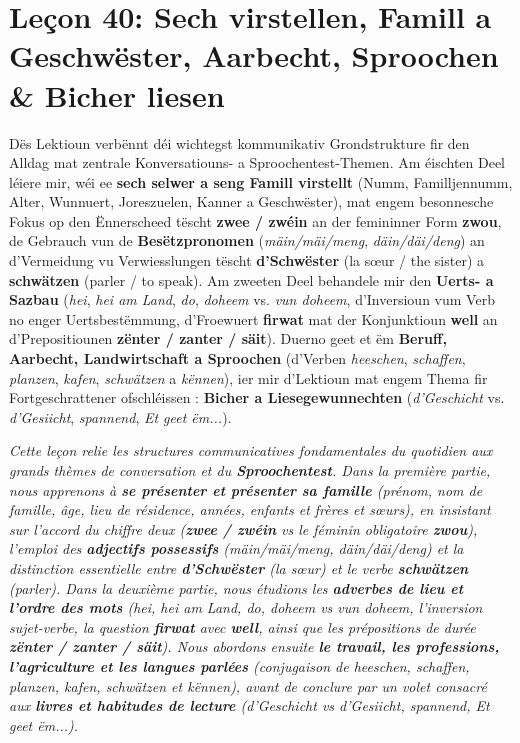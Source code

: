 \chapter[Leçon 40: Sech virstellen, Famill, Aarbecht, Sproochen \& Liesen]{Leçon 40: Sech virstellen, Famill a Geschwëster, Aarbecht, Sproochen \& Bicher liesen}

Dës Lektioun verbënnt déi wichtegst kommunikativ Grondstrukture fir den Alldag mat zentrale Konversatiouns- a Sproochentest-Themen. Am éischten Deel léiere mir, wéi ee \textbf{sech selwer a seng Famill virstellt} (Numm, Familljennumm, Alter, Wunnuert, Joreszuelen, Kanner a Geschwëster), mat engem besonnesche Fokus op den Ënnerscheed tëscht \textbf{zwee / zwéin} an der femininner Form \textbf{zwou}, de Gebrauch vun de \textbf{Besëtzpronomen} (\textit{mäin/mäi/meng}, \textit{däin/däi/deng}) an d'Vermeidung vu Verwiesslungen tëscht \textbf{d'Schwëster} (la sœur / the sister) a \textbf{schwätzen} (parler / to speak). Am zweeten Deel behandele mir den \textbf{Uerts- a Sazbau} (\textit{hei}, \textit{hei am Land}, \textit{do}, \textit{doheem} vs. \textit{vun doheem}, d'Inversioun vum Verb no enger Uertsbestëmmung, d'Froewuert \textbf{firwat} mat der Konjunktioun \textbf{well} an d'Prepositiounen \textbf{zënter / zanter / säit}). Duerno geet et ëm \textbf{Beruff, Aarbecht, Landwirtschaft a Sproochen} (d'Verben \textit{heeschen}, \textit{schaffen}, \textit{planzen}, \textit{kafen}, \textit{schwätzen} a \textit{kënnen}), ier mir d'Lektioun mat engem Thema fir Fortgeschrattener ofschléissen : \textbf{Bicher a Liesegewunnechten} (\textit{d'Geschicht} vs. \textit{d'Gesiicht}, \textit{spannend}, \textit{Et geet ëm...}).

\textit{Cette leçon relie les structures communicatives fondamentales du quotidien aux grands thèmes de conversation et du \textbf{Sproochentest}. Dans la première partie, nous apprenons à \textbf{se présenter et présenter sa famille} (prénom, nom de famille, âge, lieu de résidence, années, enfants et frères et sœurs), en insistant sur l'accord du chiffre deux (\textbf{zwee / zwéin} vs le féminin obligatoire \textbf{zwou}), l'emploi des \textbf{adjectifs possessifs} (\textit{mäin/mäi/meng}, \textit{däin/däi/deng}) et la distinction essentielle entre \textbf{d'Schwëster} (la sœur) et le verbe \textbf{schwätzen} (parler). Dans la deuxième partie, nous étudions les \textbf{adverbes de lieu et l'ordre des mots} (\textit{hei}, \textit{hei am Land}, \textit{do}, \textit{doheem} vs \textit{vun doheem}, l'inversion sujet-verbe, la question \textbf{firwat} avec \textbf{well}, ainsi que les prépositions de durée \textbf{zënter / zanter / säit}). Nous abordons ensuite \textbf{le travail, les professions, l'agriculture et les langues parlées} (conjugaison de \textit{heeschen}, \textit{schaffen}, \textit{planzen}, \textit{kafen}, \textit{schwätzen} et \textit{kënnen}), avant de conclure par un volet consacré aux \textbf{livres et habitudes de lecture} (\textit{d'Geschicht} vs \textit{d'Gesiicht}, \textit{spannend}, \textit{Et geet ëm...}).}

